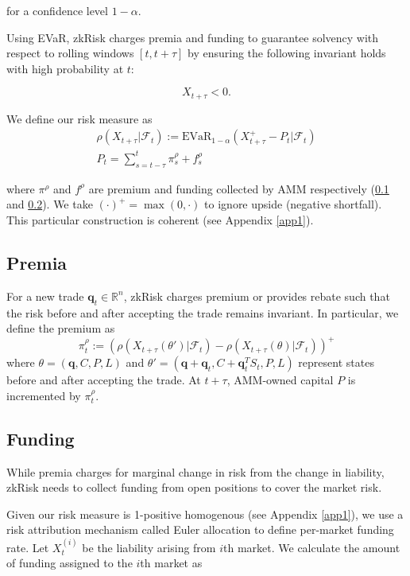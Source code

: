 \documentclass{article}
\begin{document}
for a confidence level $1-\alpha$. 

Using EVaR, zkRisk charges premia and funding to guarantee solvency with respect to rolling windows $[t,t+\tau]$ by ensuring the following invariant holds with high probability at $t$:

\begin{equation}\label{eq:solvency}
    X_{t+\tau} < 0.
\end{equation}

We define our risk measure as
\begin{gather}\label{eq:risk}
    \rho(X_{t+\tau}|\mathcal{F}_t) := \text{EVaR}_{1-\alpha}(X_{t+\tau}^+ - P_t|\mathcal{F}_t) \\ 
    P_t = \sum_{s=t-\tau}^t \pi^\rho_s + f^\rho_s 
\end{gather}

where $\pi^\rho$ and $f^\rho$ are premium and funding collected by AMM respectively (\ref{premia} and \ref{funding}). We take $(\cdot)^+ = \max(0, \cdot)$ to ignore upside (negative shortfall). This particular construction is coherent (see Appendix \ref{app1}).

\subsection{Premia}\label{premia}

For a new trade $\mathbf{q}_t \in \mathbb{R}^n$, zkRisk charges premium or provides rebate such that the risk before and after accepting the trade remains invariant. In particular, we define the premium as
\begin{equation}\label{risk-indiff}
    \pi^\rho_t := (\rho(X_{t+\tau}(\theta') | \mathcal{F}_t) -
    \rho(X_{t+\tau}(\theta)|\mathcal{F}_t))^+
\end{equation}
where $\theta = (\mathbf{q}, C, P, L)$ and $\theta' = (\mathbf{q}+\mathbf{q}_t, C+\mathbf{q}_t^TS_t, P, L)$ represent states before and after accepting the trade. At $t+\tau$, AMM-owned capital $P$ is incremented by $\pi_t^\rho$.

\subsection{Funding}\label{funding}

While premia charges for marginal change in risk from the change in liability, zkRisk needs to collect funding from open positions to cover the market risk.

Given our risk measure is 1-positive homogenous (see Appendix \ref{app1}), we use a risk attribution mechanism called Euler allocation to define per-market funding rate. Let $X_{t}^{(i)}$ be the liability arising from $i$th market. We calculate the amount of funding assigned to the $i$th market as
\end{document}
